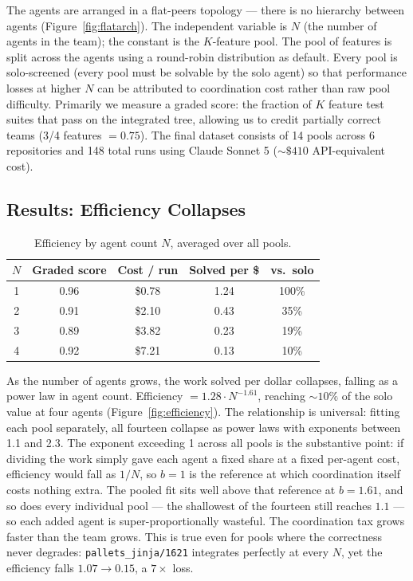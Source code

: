 \documentclass[11pt,a4paper]{article}
\begin{document}
The agents are arranged in a flat-peers topology --- there is no hierarchy between agents (Figure~\ref{fig:flatarch}). The independent variable is $N$ (the number of agents in the team); the constant is the $K$-feature pool. The pool of features is split across the agents using a round-robin distribution as default. Every pool is solo-screened (every pool must be solvable by the solo agent) so that performance losses at higher $N$ can be attributed to coordination cost rather than raw pool difficulty. Primarily we measure a graded score: the fraction of $K$ feature test suites that pass on the integrated tree, allowing us to credit partially correct teams (3/4 features $= 0.75$). The final dataset consists of 14 pools across 6 repositories and 148 total runs using Claude Sonnet 5 (${\sim}\$410$ API-equivalent cost).

\subsection{Results: Efficiency Collapses}\label{sec:poolresults}

\begin{table}[h!]
\centering
\vspace{0.9\baselineskip}
	\caption{Efficiency by agent count $N$, averaged over all pools.\label{tab:efficiency}}
   \renewcommand{\arraystretch}{1.1}
   \setlength{\tabcolsep}{6pt}
\begin{tabular}{ccccc}
 \toprule
 $N$ & Graded score & Cost / run & Solved per \$ & vs.\ solo \\
 \midrule
 1 & 0.96 & \$0.78 & 1.24 & 100\% \\
 2 & 0.91 & \$2.10 & 0.43 & 35\% \\
 3 & 0.89 & \$3.82 & 0.23 & 19\% \\
 4 & 0.92 & \$7.21 & 0.13 & 10\% \\
 \bottomrule
\end{tabular}
\vspace{0.9\baselineskip}
\end{table}

As the number of agents grows, the work solved per dollar collapses, falling as a power law in agent count. Efficiency $= 1.28 \cdot N^{-1.61}$, reaching ${\sim}10\%$ of the solo value at four agents (Figure~\ref{fig:efficiency}). The relationship is universal: fitting each pool separately, all fourteen collapse as power laws with exponents between 1.1 and 2.3. The exponent exceeding 1 across all pools is the substantive point: if dividing the work simply gave each agent a fixed share at a fixed per-agent cost, efficiency would fall as $1/N$, so $b = 1$ is the reference at which coordination itself costs nothing extra. The pooled fit sits well above that reference at $b = 1.61$, and so does every individual pool --- the shallowest of the fourteen still reaches $1.1$ --- so each added agent is super-proportionally wasteful. The coordination tax grows faster than the team grows. This is true even for pools where the correctness never degrades: \texttt{pallets\_jinja/1621} integrates perfectly at every $N$, yet the efficiency falls $1.07 \rightarrow 0.15$, a $7\times$ loss.
\end{document}
